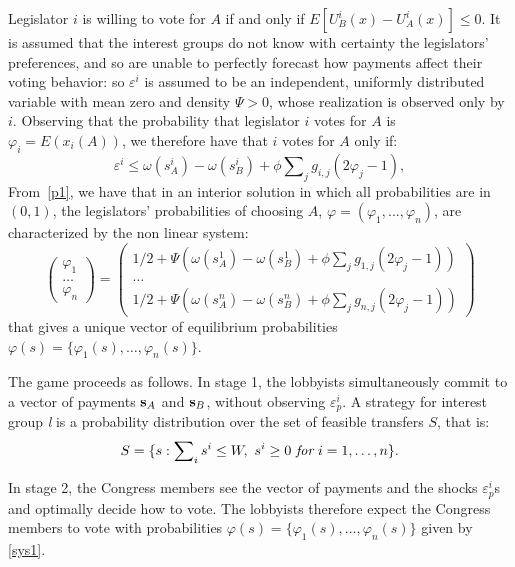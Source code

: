 \documentclass[nojss]{jss}
\begin{document}
Legislator $i$ is willing to vote for $A$ if and only if $E\left[
U_{B}^{i}(x)-U_{A}^{i}(x)\right] \leq 0$. It is assumed that the interest groups do not know with certainty the legislators' preferences, and so are unable to perfectly forecast how payments affect their voting behavior: so $\varepsilon ^{i}$ is assumed to be an independent, uniformly distributed variable with mean zero and density $\Psi >0$, whose realization is observed
only by $i$. Observing that the probability that legislator $i$ votes for $A$ is $\varphi _{i}=E(x_{i}(A))$, we therefore have that $i$ votes for $A$ only if:
\begin{equation}
	\varepsilon^{i}\leq \omega (s_{A}^{i})-\omega (s_{B}^{i})+\phi
	\sum\nolimits_{j}g_{i,j}\left( 2\varphi _{j}-1\right) ,  \label{p1}
\end{equation}%
From~\ref{p1}, we have that in an interior solution in which all probabilities are in $(0,1)$, the legislators' probabilities of choosing $A$, $\varphi =(\varphi _{1},...,\varphi _{n})$, are characterized by the non linear system:
\begin{equation}
	\left( 
	\begin{array}{c}
		\varphi _{1} \\ 
		\dots \\ 
		\varphi _{n}%
	\end{array}%
	\right) =\left( 
	\begin{array}{c}
		1/2+\Psi \left( \omega (s_{A}^{1})-\omega (s_{B}^{1})+\phi
		\sum\nolimits_{j}g_{1,j}\left( 2\varphi _{j}-1\right) \right) \\ 
		\dots \\ 
		1/2+\Psi \left( \omega (s_{A}^{n})-\omega (s_{B}^{n})+\phi
		\sum\nolimits_{j}g_{n,j}\left( 2\varphi _{j}-1\right) \right)%
	\end{array}%
	\right)  \label{sys1}
\end{equation}%
that gives a unique vector of equilibrium probabilities $\varphi
(s)=\{\varphi _{1}(s),\dots,\varphi _{n}(s)\}$.

The game proceeds as follows. In stage 1, the lobbyists simultaneously commit to a vector of payments ${\bf s}_{A}$ and ${\bf s}_{B}$, without observing $\varepsilon^{i}_{p}$. A strategy for interest group \textit{l} is a probability distribution over the set of feasible transfers $S$, that is: 
\[S=\{s:\sum\nolimits_{i}s^{i}\leq W,\text{ }s^{i}\geq 0\text{ {\it for} } i=1,\dots,n\}.\]

In stage 2, the Congress members see the vector of payments and the shocks $\varepsilon^{i}_{p}$s and optimally decide how to vote. The lobbyists therefore expect the Congress members to vote with probabilities $\varphi
(s)=\{\varphi _{1}(s),\dots,\varphi _{n}(s)\}$ given by \ref{sys1}.
\end{document}
